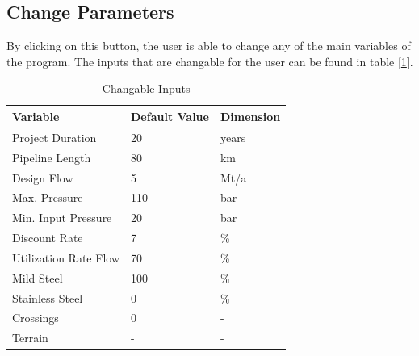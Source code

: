 \documentclass{article}
\begin{document}
\subsection{Change Parameters}
By clicking on this button, the user is able to change any of the main variables of the program. The inputs that are changable for the user can be found in table [\ref{table:Inputs}].
\begin{table}[h]
\centering
\begin{tabular}{@{}lll@{}}
\toprule
Variable              & Default Value & Dimension \\ \midrule
Project Duration      & 20            & years     \\
Pipeline Length       & 80            & km        \\
Design Flow           & 5             & Mt/a      \\
Max. Pressure         & 110           & bar       \\
Min. Input Pressure   & 20            & bar       \\
Discount Rate         & 7             & \%        \\
Utilization Rate Flow & 70            & \%        \\
Mild Steel            & 100           & \%        \\
Stainless Steel       & 0             & \%        \\
Crossings             & 0             & -         \\
Terrain               & -             & -        
\end{tabular}
\caption{Changable Inputs}
\label{table:Inputs}
\end{table}
\end{document}
